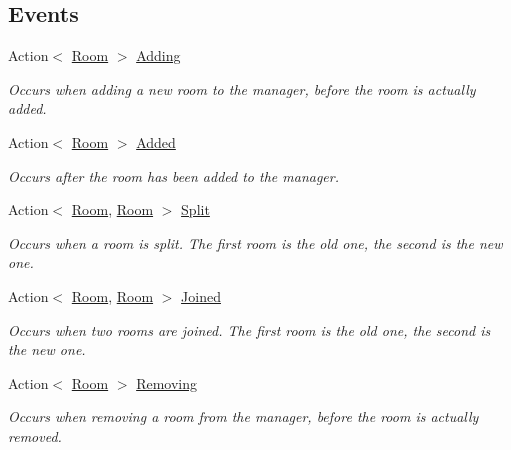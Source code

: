 \subsection*{Events}
\begin{DoxyCompactItemize}
\item 
Action$<$ \hyperlink{class_project_porcupine_1_1_rooms_1_1_room}{Room} $>$ \hyperlink{class_project_porcupine_1_1_rooms_1_1_room_manager_a38434c8e6574c833249a75aebf9b0706}{Adding}
\begin{DoxyCompactList}\small\item\em Occurs when adding a new room to the manager, before the room is actually added. \end{DoxyCompactList}\item 
Action$<$ \hyperlink{class_project_porcupine_1_1_rooms_1_1_room}{Room} $>$ \hyperlink{class_project_porcupine_1_1_rooms_1_1_room_manager_a89751a39cba37e08030063dbddbf3b0c}{Added}
\begin{DoxyCompactList}\small\item\em Occurs after the room has been added to the manager. \end{DoxyCompactList}\item 
Action$<$ \hyperlink{class_project_porcupine_1_1_rooms_1_1_room}{Room}, \hyperlink{class_project_porcupine_1_1_rooms_1_1_room}{Room} $>$ \hyperlink{class_project_porcupine_1_1_rooms_1_1_room_manager_ad8eb00af1baebf4e31bc07b1e0244a7a}{Split}
\begin{DoxyCompactList}\small\item\em Occurs when a room is split. The first room is the old one, the second is the new one. \end{DoxyCompactList}\item 
Action$<$ \hyperlink{class_project_porcupine_1_1_rooms_1_1_room}{Room}, \hyperlink{class_project_porcupine_1_1_rooms_1_1_room}{Room} $>$ \hyperlink{class_project_porcupine_1_1_rooms_1_1_room_manager_a68aa9c86e78c2f25228010994ab43567}{Joined}
\begin{DoxyCompactList}\small\item\em Occurs when two rooms are joined. The first room is the old one, the second is the new one. \end{DoxyCompactList}\item 
Action$<$ \hyperlink{class_project_porcupine_1_1_rooms_1_1_room}{Room} $>$ \hyperlink{class_project_porcupine_1_1_rooms_1_1_room_manager_ab886414089e90a69275832444a3e6c66}{Removing}
\begin{DoxyCompactList}\small\item\em Occurs when removing a room from the manager, before the room is actually removed. \end{DoxyCompactList}\item 

\end{DoxyCompactItemize}
